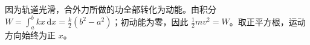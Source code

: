 因为轨道光滑，合外力所做的功全部转化为动能。由积分 $W=\int_a^b kx\,\mathrm dx=\frac{k}{2}(b^2-a^2)$；初动能为零，因此 $\frac12mv^2=W$。取正平方根，运动方向始终为正 $x$。
